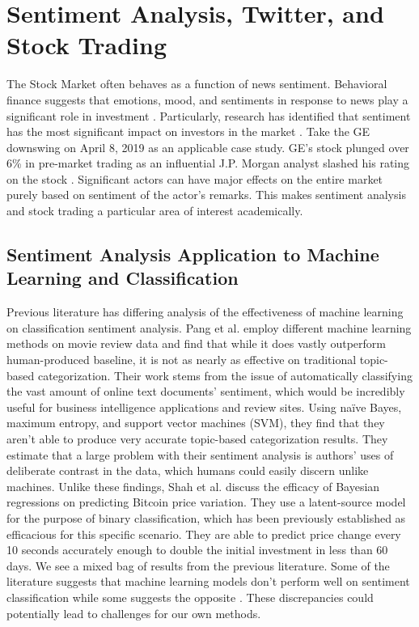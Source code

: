 \documentclass[../thesis.tex]{subfiles}
\begin{document}
\section{Sentiment Analysis, Twitter, and Stock Trading}

The Stock Market often behaves as a function of news sentiment. Behavioral finance suggests that emotions, mood, and sentiments in response to news play a significant role in investment \cite{Ho2016}. Particularly, research has identified that sentiment has the most significant impact on investors in the market \cite{Ho2016}. Take the GE downswing on April 8, 2019 as an applicable case study. GE's stock plunged over 6\% in pre-market trading as an influential J.P. Morgan analyst slashed his rating on the stock \cite{Sozzi2019}. Significant actors can have major effects on the entire market purely based on sentiment of the actor's remarks. This makes sentiment analysis and stock trading a particular area of interest academically. 


\subsection{Sentiment Analysis Application to Machine Learning and Classification}

Previous literature has differing analysis of the effectiveness of machine learning on classification sentiment analysis. Pang et al. \cite{Pang} employ different machine learning methods on movie review data and find that while it does vastly outperform human-produced baseline, it is not as nearly as effective on traditional topic-based categorization. Their work stems from the issue of automatically classifying the vast amount of online text documents' sentiment, which would be incredibly useful for business intelligence applications and review sites. Using na\"{i}ve Bayes, maximum entropy, and support vector machines (SVM), they find that they aren't able to produce very accurate topic-based categorization results. They estimate that a large problem with their sentiment analysis is authors' uses of deliberate contrast in the data, which humans could easily discern unlike machines. Unlike these findings, Shah et al. \cite{Shah2014} discuss the efficacy of Bayesian regressions on predicting Bitcoin price variation. They use a latent-source model for the purpose of binary classification, which has been previously established as efficacious for this specific scenario. They are able to predict price change every 10 seconds accurately enough to double the initial investment in less than 60 days. We see a mixed bag of results from the previous literature. Some of the literature suggests that machine learning models don't perform well on sentiment classification \cite{Pang} while some suggests the opposite \cite{Shah2014}. These discrepancies could potentially lead to challenges for our own methods. 
\end{document}
